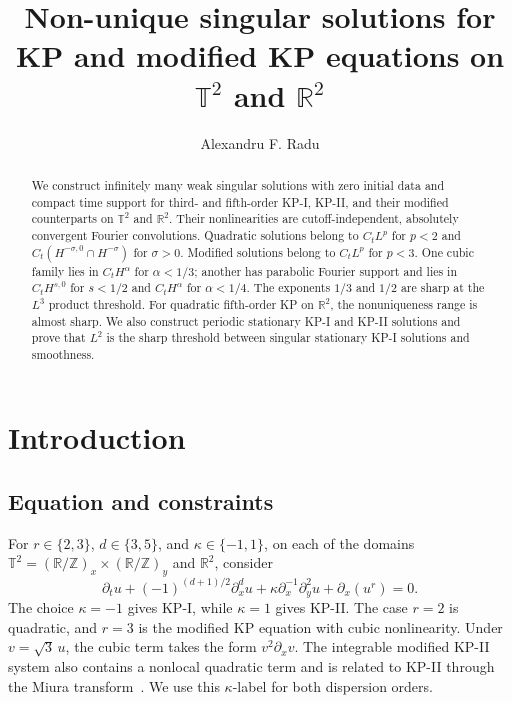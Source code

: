 \documentclass[12pt,reqno,letterpaper]{amsart}
\title[Singular solutions for KP and modified KP equations]
{Non-unique singular solutions for KP and modified KP equations on
$\mathbb T^2$ and $\mathbb R^2$}
\author{Alexandru F. Radu}
\numberwithin{equation}{section}
\theoremstyle{definition}
\newcommand{\T}{\mathbb T}
\newcommand{\R}{\mathbb R}
\newcommand{\Z}{\mathbb Z}
\begin{document}
\begin{abstract}
We construct infinitely many weak singular solutions with zero initial data
and compact time support for third- and fifth-order KP-I, KP-II, and their
modified counterparts on $\mathbb T^2$ and $\mathbb R^2$.  Their nonlinearities
are cutoff-independent, absolutely convergent Fourier convolutions.  Quadratic
solutions belong to $C_tL^p$ for $p<2$ and
$C_t(H^{-\sigma,0}\cap H^{-\sigma})$ for $\sigma>0$.  Modified solutions
belong to $C_tL^p$ for $p<3$.  One cubic family lies in $C_tH^\alpha$ for
$\alpha<1/3$; another has parabolic Fourier support and lies in $C_tH^{s,0}$
for $s<1/2$ and $C_tH^\alpha$ for $\alpha<1/4$.  The exponents $1/3$ and
$1/2$ are sharp at the $L^3$ product threshold.  For quadratic fifth-order
KP on $\mathbb R^2$, the nonuniqueness range is almost sharp.  We also
construct periodic stationary KP-I and KP-II solutions and prove that $L^2$
is the sharp threshold between singular stationary KP-I solutions and
smoothness.
\end{abstract}


\maketitle

\section{Introduction}

\subsection{Equation and constraints}

For $r\in\{2,3\}$, $d\in\{3,5\}$, and
$\kappa\in\{-1,1\}$, on each of the domains
$\T^2=(\R/\Z)_x\times(\R/\Z)_y$ and $\R^2$, consider
\begin{equation}\label{eq:KP-family}
 \partial_tu+(-1)^{(d+1)/2}\partial_x^du
 +\kappa\partial_x^{-1}\partial_y^2u+\partial_x(u^r)=0.
\end{equation}
The choice $\kappa=-1$ gives KP-I, while $\kappa=1$ gives KP-II.  The
case $r=2$ is quadratic, and $r=3$ is the modified KP equation with cubic
nonlinearity.  Under $v=\sqrt3\,u$, the cubic term takes the form
$v^2\partial_xv$.  The integrable modified KP-II system also contains a
nonlocal quadratic term and is related to KP-II through the Miura transform~\cite{KenigMartel}.
We use this $\kappa$-label for both dispersion orders.
\end{document}
